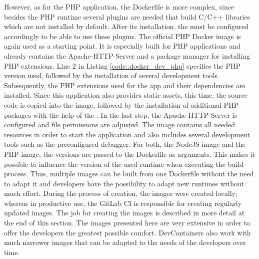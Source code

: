         However, as for the PHP application, the Dockerfile is more complex, since besides the PHP runtime several plugins are needed that build C/C++ libraries which are not installed by default. After its installation, the  must be configured accordingly to be able to use these plugins. The official PHP Docker image is again used as a starting point. It is especially built for PHP applications and already contains the Apache-\acs{HTTP}-Server and a package manager for installing PHP extensions. Line 2 in Listing \ref{code::docker_dev_php} specifies the PHP version used, followed by the installation of several development tools. Subsequently, the PHP extensions used for the app and their dependencies are installed. Since this application also provides static assets, this time, the source code is copied into the image, followed by the installation of additional PHP packages with the help of the . In the last step, the Apache \acs{HTTP} Server is configured and file permissions are adjusted. The image contains all needed resources in order to start the application and also includes several development tools such as the preconfigured  debugger.\newline
        For both, the NodeJS image and the PHP image, the versions are passed to the Dockerfile as arguments. This makes it possible to influence the version of the used runtime when executing the build process. Thus, multiple images can be built from one Dockerfile without the need to adapt it and developers have the possibility to adapt new runtimes without much effort. During the process of creation, the images were created locally; whereas in productive use, the GitLab \ac{CI} is responsible for creating regularly updated images. The job for creating the images is described in more detail at the end of this section. The images presented here are very extensive in order to offer the developers the greatest possible comfort. DevContainers also work with much narrower images that can be adapted to the needs of the developers over time.


